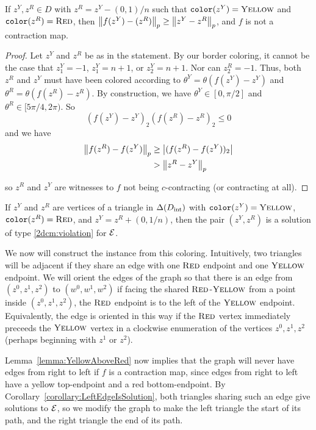  \begin{lemma} \label{lemma:YellowAboveRed}
    If $z^Y, z^R \in D$ with $z^R = z^Y - (0,1)/n$ such that $\operatorname{\texttt{color}}(z^Y) = \textsc{Yellow}$ and $\operatorname{\texttt{color}}(z^R) = \textsc{Red}$, then $\left\| f(z^Y) - (z^R) \right\|_p \geq \left\| z^Y - z^R \right\|_p$, and $f$ is not a contraction map.
  \end{lemma}

  \begin{proof}
    Let $z^Y$ and $z^R$ be as in the statement. By our border coloring, it cannot be the case that $z^Y_1 = -1$, $z^Y_1 = n+1$, or $z^Y_2 = n+1$. Nor can $z^R_2 = -1$. Thus, both $z^R$ and $z^Y$ must have been colored according to $\theta^Y = \theta(f(z^Y) - z^Y)$ and $\theta^R = \theta(f(z^R) - z^R)$. By construction, we have $\theta^Y \in [0,\pi/2]$ and $\theta^R \in [5\pi/4,2\pi)$. So \[ (f(z^Y) - z^Y)_2 (f(z^R) - z^R)_2 \leq 0 \] and we have
    \begin{align*}
      \left\| f(z^R) - f(z^Y) \right\|_p &\geq \left| (f(z^R) - f(z^Y))_2 \right| \\
                               &> \left\| z^R - z^Y \right\|_p
    \end{align*}

    so $z^R$ and $z^Y$ are witnesses to $f$ not being $c$-contracting (or contracting at all).
  \end{proof}

  \begin{corollary} \label{corollary:LeftEdgeIsSolution}
    If $z^Y$ and $z^R$ are vertices of a triangle in $\Delta(D_{\mathrm{int}})$ with $\operatorname{\texttt{color}}(z^Y) = \textsc{Yellow}$, $\operatorname{\texttt{color}}(z^R) = \textsc{Red}$, and $z^Y = z^R + (0,1/n)$, then the pair $(z^Y,z^R)$ is a solution of type \ref{2dcm:violation} for $\mbox{${\mathcal E}$}$.
  \end{corollary}

  We now will construct the \EOPL instance from this coloring. Intuitively, two triangles will be adjacent if they share an edge with one $\textsc{Red}$ endpoint and one $\textsc{Yellow}$ endpoint. We will orient the edges of the \EOPL graph so that there is an edge from $(z^0, z^1, z^2)$ to $(w^0, w^1, w^2)$ if facing the shared $\textsc{Red}$-$\textsc{Yellow}$ from a point inside $(z^0, z^1, z^2)$, the $\textsc{Red}$ endpoint is to the left of the $\textsc{Yellow}$ endpoint. Equivalently, the edge is oriented in this way if the $\textsc{Red}$ vertex immediately preceeds the $\textsc{Yellow}$ vertex in a clockwise enumeration of the vertices $z^0,z^1,z^2$ (perhaps beginning with $z^1$ or $z^2$). 

  Lemma~\ref{lemma:YellowAboveRed} now implies that the \EOPL graph will never have edges from right to left if $f$ is a contraction map, since edges from right to left have a yellow top-endpoint and a red bottom-endpoint. By Corollary~\ref{corollary:LeftEdgeIsSolution}, both triangles sharing such an edge give solutions to $\mbox{${\mathcal E}$}$, so we modify the graph to make the left triangle the start of its path, and the right triangle the end of its path.

